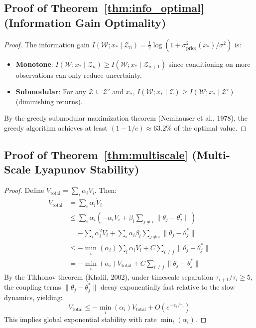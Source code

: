 \documentclass[11pt,twocolumn]{article}
\theoremstyle{definition}
\newcommand{\cW}{\mathcal{W}}
\newcommand{\cZ}{\mathcal{Z}}
\begin{document}
\subsection{Proof of Theorem~\ref{thm:info_optimal} (Information Gain Optimality)}

\begin{proof}
The information gain $I(\cW; x_* \mid \cZ_n) = \frac{1}{2}\log(1 + \sigma_{\text{prior}}^2(x_*)/\sigma^2)$ is:
\begin{itemize}[leftmargin=*]
    \item \textbf{Monotone}: $I(\cW; x_* \mid \cZ_n) \geq I(\cW; x_* \mid \cZ_{n+1})$ since conditioning on more observations can only reduce uncertainty.
    \item \textbf{Submodular}: For any $\cZ \subseteq \cZ'$ and $x_*$, $I(\cW; x_* \mid \cZ) \geq I(\cW; x_* \mid \cZ')$ (diminishing returns).
\end{itemize}
By the greedy submodular maximization theorem (Nemhauser et al., 1978), the greedy algorithm achieves at least $(1-1/e) \approx 63.2\%$ of the optimal value.
\end{proof}

\subsection{Proof of Theorem~\ref{thm:multiscale} (Multi-Scale Lyapunov Stability)}

\begin{proof}
Define $V_{\text{total}} = \sum_i \alpha_i V_i$. Then:
\begin{align}
\dot{V}_{\text{total}} &= \sum_i \alpha_i \dot{V}_i \\
&\leq \sum_i \alpha_i \left(-\alpha_i V_i + \beta_i \sum_{j \neq i} \|\theta_j - \theta_j^*\|\right) \\
&= -\sum_i \alpha_i^2 V_i + \sum_i \alpha_i \beta_i \sum_{j \neq i} \|\theta_j - \theta_j^*\| \\
&\leq -\min_i(\alpha_i) \sum_i \alpha_i V_i + C \sum_{i \neq j} \|\theta_j - \theta_j^*\| \\
&= -\min_i(\alpha_i) V_{\text{total}} + C \sum_{i \neq j} \|\theta_j - \theta_j^*\|
\end{align}
By the Tikhonov theorem (Khalil, 2002), under timescale separation $\tau_{i+1}/\tau_i \geq 5$, the coupling terms $\|\theta_j - \theta_j^*\|$ decay exponentially fast relative to the slow dynamics, yielding:
\begin{equation}
\dot{V}_{\text{total}} \leq -\min_i(\alpha_i) V_{\text{total}} + O(e^{-\tau_2/\tau_1})
\end{equation}
This implies global exponential stability with rate $\min_i(\alpha_i)$.
\end{proof}
\end{document}
